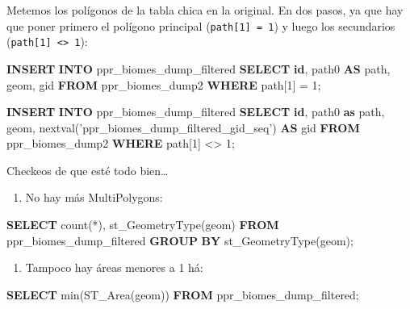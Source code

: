 \documentclass[spanish,]{article}
\newenvironment{Shaded}{}{}
\newcommand{\KeywordTok}[1]{\textcolor[rgb]{0.00,0.44,0.13}{\textbf{{#1}}}}
\newcommand{\DecValTok}[1]{\textcolor[rgb]{0.25,0.63,0.44}{{#1}}}
\newcommand{\StringTok}[1]{\textcolor[rgb]{0.25,0.44,0.63}{{#1}}}
\newcommand{\FunctionTok}[1]{\textcolor[rgb]{0.02,0.16,0.49}{{#1}}}
\newcommand{\NormalTok}[1]{{#1}}
\providecommand{\tightlist}{%
  \setlength{\itemsep}{0pt}\setlength{\parskip}{0pt}}
\begin{document}
Metemos los polígonos de la tabla chica en la original. En dos pasos, ya
que hay que poner primero el polígono principal
(\texttt{path{[}1{]}\ =\ 1}) y luego los secundarios
(\texttt{path{[}1{]}\ \textless{}\textgreater{}\ 1}):

\begin{Shaded}
\begin{Highlighting}[]
\KeywordTok{INSERT} \KeywordTok{INTO} \NormalTok{ppr_biomes_dump_filtered}
  \KeywordTok{SELECT} \KeywordTok{id}\NormalTok{, path0 }\KeywordTok{AS} \NormalTok{path, geom, gid}
    \KeywordTok{FROM} \NormalTok{ppr_biomes_dump2}
   \KeywordTok{WHERE} \NormalTok{path[}\DecValTok{1}\NormalTok{] = }\DecValTok{1}\NormalTok{;}

\KeywordTok{INSERT} \KeywordTok{INTO} \NormalTok{ppr_biomes_dump_filtered}
\KeywordTok{SELECT} \KeywordTok{id}\NormalTok{, path0 }\KeywordTok{as} \NormalTok{path, geom, }
       \NormalTok{nextval(}\StringTok{'ppr_biomes_dump_filtered_gid_seq'}\NormalTok{) }\KeywordTok{AS} \NormalTok{gid}
  \KeywordTok{FROM} \NormalTok{ppr_biomes_dump2}
 \KeywordTok{WHERE} \NormalTok{path[}\DecValTok{1}\NormalTok{] <> }\DecValTok{1}\NormalTok{;}
\end{Highlighting}
\end{Shaded}

Checkeos de que esté todo bien\ldots{}

\begin{enumerate}
\def\labelenumi{\arabic{enumi}.}
\tightlist
\item
  No hay más MultiPolygons:
\end{enumerate}

\begin{Shaded}
\begin{Highlighting}[]
\KeywordTok{SELECT} \FunctionTok{count}\NormalTok{(*), st_GeometryType(geom) }
  \KeywordTok{FROM} \NormalTok{ppr_biomes_dump_filtered }
 \KeywordTok{GROUP} \KeywordTok{BY} \NormalTok{st_GeometryType(geom);}
\end{Highlighting}
\end{Shaded}

\begin{enumerate}
\def\labelenumi{\arabic{enumi}.}
\setcounter{enumi}{1}
\tightlist
\item
  Tampoco hay áreas menores a 1 há:
\end{enumerate}

\begin{Shaded}
\begin{Highlighting}[]
\KeywordTok{SELECT} \FunctionTok{min}\NormalTok{(ST_Area(geom)) }\KeywordTok{FROM} \NormalTok{ppr_biomes_dump_filtered;}
\end{Highlighting}
\end{Shaded}
\end{document}
